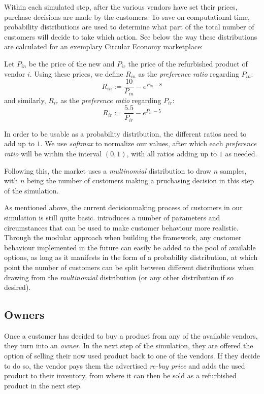 Within each simulated step, after the various vendors have set their prices, purchase decisions are made by the customers. To save on computational time, probability distributions are used to determine what part of the total number of customers will decide to take which action. See below the way these distributions are calculated for an exemplary Circular Economy marketplace:

Let \(P_{in}\) be the price of the new and \(P_{ir}\) the price of the refurbished product of vendor \(i\). Using these prices, we define \(R_{in}\) as the \emph{preference ratio} regarding \(P_{in}\):
\begin{equation}
	R_{in} := \frac{10}{P_{in}} - e^{P_{in} - 8}
\end{equation}
and similarly, \(R_{ir}\) as the \emph{preference ratio} regarding \(P_{ir}\):
\begin{equation}
	R_{ir} := \frac{5.5}{P_{ir}} - e^{P_{ir} - 5}
\end{equation}

In order to be usable as a probability distribution, the different ratios need to add up to \(1\). We use \emph{softmax} to normalize our values, after which each \emph{preference ratio} will be within the interval \((0,1)\), with all ratios adding up to \(1\) as needed.

Following this, the market uses a \emph{multinomial} distribution to draw \(n\) samples, with \(n\) being the number of customers making a pruchasing decision in this step of the simulation.

As mentioned above, the current decisionmaking process of customers in our simulation is still quite basic.  introduces a number of parameters and circumstances that can be used to make customer behaviour more realistic. Through the modular approach when building the framework, any customer behaviour implemented in the future can easily be added to the pool of available options, as long as it manifests in the form of a probability distribution, at which point the number of customers can be split between different distributions when drawing from the \emph{multinomial} distribution (or any other distribution if so desired).

\subsection*{Owners}

Once a customer has decided to buy a product from any of the available vendors, they turn into an \emph{owner}. In the next step of the simulation, they are offered the option of selling their now used product back to one of the vendors. If they decide to do so, the vendor pays them the advertised \emph{re-buy price} and adds the used product to their inventory, from where it can then be sold as a refurbished product in the next step.

